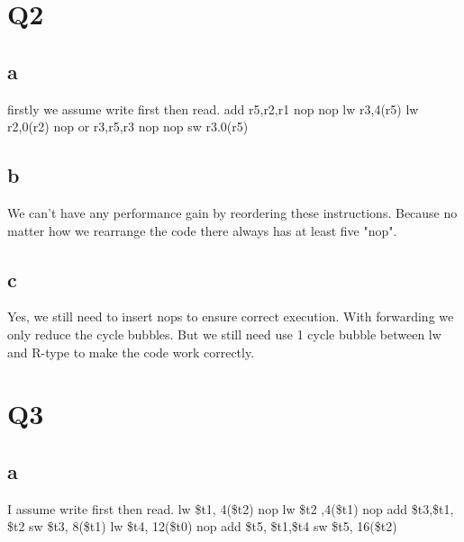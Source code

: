 \documentclass[]{article}
\begin{document}
\section*{Q2}
\subsection*{a}
firstly we assume write first then read. \newline
\newline
add r5,r2,r1 \newline
nop\newline
nop\newline
lw r3,4(r5)\newline
lw r2,0(r2)\newline
nop\newline
or r3,r5,r3\newline
nop\newline
nop\newline
sw r3.0(r5)\newline

\subsection*{b}
We can't have any performance gain by reordering these instructions. Because no matter how we rearrange the code there always has at least five "nop".\newline
\subsection*{c}
Yes, we still need to insert nops to ensure correct execution.  With forwarding we only reduce the cycle bubbles. But we still need use 1 cycle bubble between lw and R-type to make the code work correctly. 
\section*{Q3}
\subsection*{a}
I assume write first then read.\newline
lw \$t1, 4(\$t2)\newline
nop\newline
lw \$t2 ,4(\$t1)\newline
nop\newline
add \$t3,\$t1, \$t2\newline
sw \$t3, 8(\$t1)\newline
lw \$t4, 12(\$t0)\newline
nop\newline
add \$t5, \$t1,\$t4\newline
sw \$t5, 16(\$t2)\newline
\end{document}
